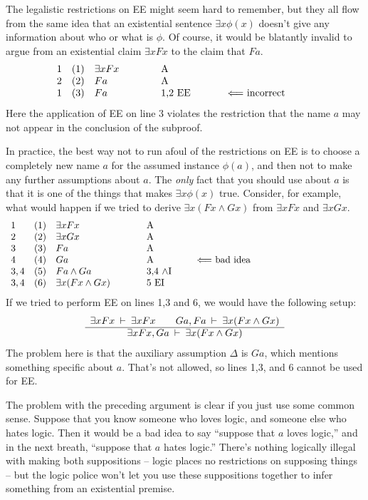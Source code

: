 The legalistic restrictions on EE might seem hard to remember, but
they all flow from the same idea that an existential sentence $\exists
x\phi (x)$ doesn't give any information about who or what is $\phi$.
Of course, it would be blatantly invalid to argue from an existential
claim $\exists xFx$ to the claim that $Fa$.
\[ \begin{array}{l l >{$}p{2cm}<{$} p{2cm} p{3cm}}
     1 & (1) & \exists xFx & A & \\
     2 & (2) & Fa          & A & \\
     1 & (3) & Fa          & 1,2 EE & $\Longleftarrow$
                                      incorrect \end{array} \]
Here the application of EE on line $3$ violates the restriction that
the name $a$ may not appear in the conclusion of the subproof.  

In practice, the best way not to run afoul of the restrictions on EE
is to choose a completely new name $a$ for the assumed instance
$\phi (a)$, and then not to make any further assumptions about $a$.
The {\it only} fact that you should use about $a$ is that it is one
of the things that makes $\exists x\phi (x)$ true.  Consider, for
example, what would happen if we tried to derive $\exists x(Fx\wedge
Gx)$ from $\exists xFx$ and $\exists xGx$.
\[ \begin{array}{l l >{$}p{3cm}<{$} p{1.5cm} p{6cm}}
     1 & (1) & \exists xFx  & A \\
     2 & (2) & \exists xGx  & A \\
     3 & (3) & Fa           & A \\
     4 & (4) & Ga           & A & $\Longleftarrow$ bad idea \\
     3,4 & (5) & Fa\wedge Ga  & 3,4 $\wedge$I \\
     3,4 & (6) & \exists x(Fx\wedge Gx) & 5 EI  \end{array} \]
If we tried to perform EE on lines 1,3 and 6, we would have the
following setup:
\[ \begin{array}{c c}
     \exists xFx\:\vdash\:\exists xFx \qquad Ga,Fa\:\vdash\:\exists
     x(Fx\wedge Gx) \\ \hline
     \exists xFx,Ga\:\vdash\:\exists x(Fx\wedge Gx) \end{array} \]
The problem here is that the auxiliary assumption $\Delta$ is $Ga$,
which mentions something specific about $a$.  That's not allowed, so
lines 1,3, and 6 cannot be used for EE.

The problem with the preceding argument is clear if you just use some
common sense.  Suppose that you know someone who loves logic, and
someone else who hates logic.  Then it would be a bad idea to say
``suppose that $a$ loves logic,'' and in the next breath, ``suppose
that $a$ hates logic.''  There's nothing logically illegal with making
both suppositions -- logic places no restrictions on supposing things
-- but the logic police won't let you use these suppositions together
to infer something from an existential premise.

